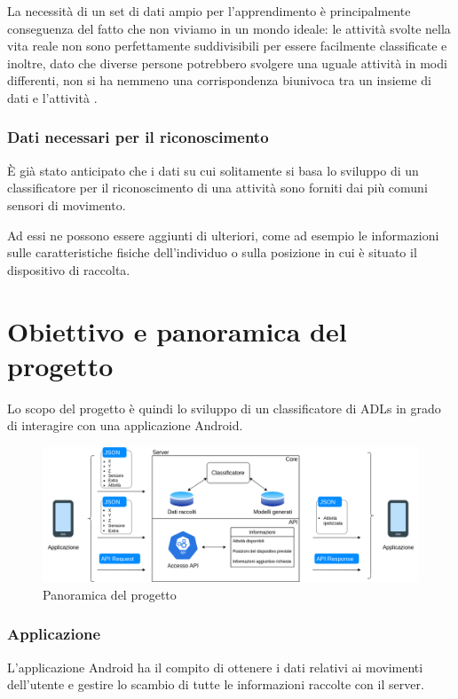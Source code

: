 La necessità di un set di dati ampio per l'apprendimento è principalmente conseguenza del fatto che non viviamo in un mondo ideale: 
le attività svolte nella vita reale non sono perfettamente suddivisibili per essere facilmente classificate e inoltre, dato che diverse persone
potrebbero svolgere una uguale attività in modi differenti, non si ha nemmeno una corrispondenza biunivoca tra un insieme di dati e l'attività \cite{framework_long_term_data_har}.

\subsubsection{Dati necessari per il riconoscimento}
È già stato anticipato che i dati su cui solitamente si basa lo sviluppo di un classificatore per il riconoscimento di una attività sono forniti dai 
più comuni sensori di movimento.

Ad essi ne possono essere aggiunti di ulteriori, come ad esempio le informazioni sulle caratteristiche fisiche
dell'individuo o sulla posizione in cui è situato il dispositivo di raccolta.

\section{Obiettivo e panoramica del progetto}
Lo scopo del progetto è quindi lo sviluppo di un classificatore di ADLs in grado di interagire con una applicazione
Android.

\begin{figure}[H]
    \centering
    \includegraphics[scale = 0.41]{assets/images/overview.png}
    \caption{Panoramica del progetto}
    \label{fig:overview}
\end{figure}

\subsubsection{Applicazione}
L'applicazione Android ha il compito di ottenere i dati relativi ai movimenti dell'utente 
e gestire lo scambio di tutte le informazioni raccolte con il server.
